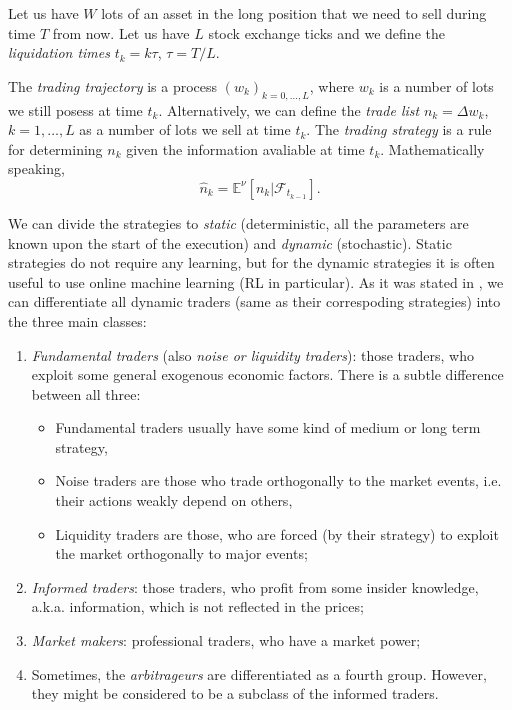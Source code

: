     Let us have $W$ lots of an asset in the long position that we need to sell during time $T$ from now.
    Let us have $L$ stock exchange ticks and we define the \emph{liquidation times} $t_k = k\tau$, $\tau = T/L$.
    \begin{definition}\label{definition:tradingtrajectory}
        The \emph{trading trajectory} is a process $(w_k)_{k = 0, \dots, L}$, where $w_k$ is a number of lots we 
        still posess at time $t_k$. Alternatively, we can define the \emph{trade list} $n_k = \Delta w_k$, $k = 1, \dots, L$ as a 
        number of lots we sell at time $t_k$.
        The \emph{trading strategy} is a rule for determining $n_k$ given the information avaliable at time $t_k$. Mathematically speaking,
        \begin{equation*}
            \hat n_k = \mathbb{E}^\nu\left[n_k\vert \mathcal{F}_{t_{k-1}}\right]. 
        \end{equation*} 
    \end{definition}
    We can divide the strategies to \emph{static} (deterministic, all the parameters are known upon the start of the execution) and \emph{dynamic} (stochastic).
    Static strategies do not require any learning, but for the dynamic strategies it is often useful to use online machine learning (RL in particular).
    As it was stated in \cite{Cartea2015}, we can differentiate all dynamic traders (same as their correspoding strategies) into the three main classes:
    \begin{enumerate}
        \item \emph{Fundamental traders} (also \emph{noise \emph{or} liquidity traders}): those traders, who exploit some general exogenous economic factors. There is a subtle difference between all three: \begin{itemize}
            \item Fundamental traders usually have some kind of medium or long term strategy,
            \item Noise traders are those who trade orthogonally to the market events, i.e. their actions weakly depend on others,
            \item Liquidity traders are those, who are forced (by their strategy) to exploit the market orthogonally to major events;
        \end{itemize}
        \item \emph{Informed traders}: those traders, who profit from some insider knowledge, a.k.a. information, which is not reflected in the prices;
        \item \emph{Market makers}: professional traders, who have a market power;
        \item Sometimes, the \emph{arbitrageurs} are differentiated as a fourth group. However, they might be considered to be a subclass of the informed traders.
    \end{enumerate}

